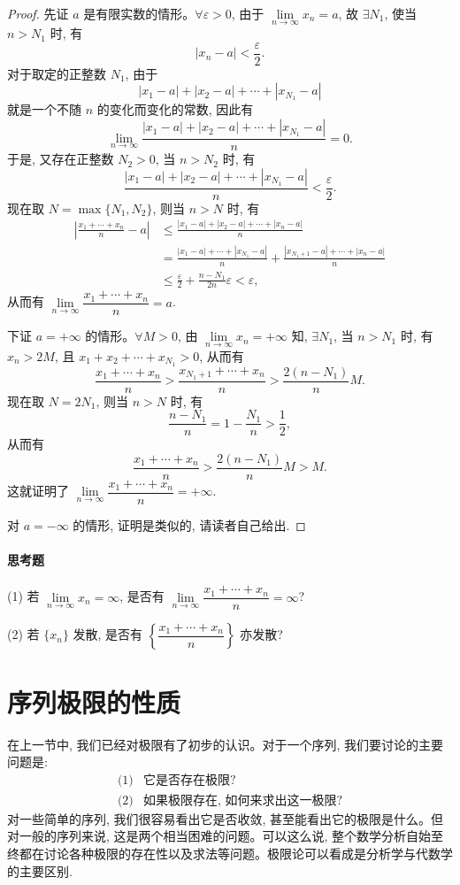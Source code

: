 \begin{proof}
先证 $a$ 是有限实数的情形。$\forall\varepsilon>0$, 由于 $\lim\limits_{n\to\infty}x_n=a$, 故 $\exists N_1$, 使当 $n>N_1$ 时, 有
\[
  |x_n-a|<\frac\varepsilon2.
\]
对于取定的正整数 $N_1$, 由于
\[
  |x_1-a|+|x_2-a|+\cdots+|x_{N_1}-a|
\]
就是一个不随 $n$ 的变化而变化的常数, 因此有
\[
  \lim_{n\to\infty}
  \frac{|x_1-a|+|x_2-a|+\cdots+|x_{N_1}-a|}{n}=0.
\]
于是, 又存在正整数 $N_2>0$, 当 $n>N_2$ 时, 有
\[
  \frac{|x_1-a|+|x_2-a|+\cdots+|x_{N_1}-a|}{n}<\frac\varepsilon2.
\]
现在取 $N=\max\{N_1,N_2\}$, 则当 $n>N$ 时, 有
\[
\begin{aligned}
  \left|\frac{x_1+\cdots+x_n}{n}-a\right|
  &\leqslant
  \frac{|x_1-a|+|x_2-a|+\cdots+|x_n-a|}{n}\\
  &=
  \frac{|x_1-a|+\cdots+|x_{N_1}-a|}{n}
  +
  \frac{|x_{N_1+1}-a|+\cdots+|x_n-a|}{n}\\
  &\leqslant \frac\varepsilon2+\frac{n-N_1}{2n}\varepsilon<\varepsilon,
\end{aligned}
\]
从而有 $\lim\limits_{n\to\infty}\dfrac{x_1+\cdots+x_n}{n}=a$.

下证 $a=+\infty$ 的情形。$\forall M>0$, 由 $\lim\limits_{n\to\infty}x_n=+\infty$ 知, $\exists N_1$, 当 $n>N_1$ 时, 有 $x_n>2M$, 且 $x_1+x_2+\cdots+x_{N_1}>0$, 从而有
\[
  \frac{x_1+\cdots+x_n}{n}
  >
  \frac{x_{N_1+1}+\cdots+x_n}{n}
  >
  \frac{2(n-N_1)}nM.
\]
现在取 $N=2N_1$, 则当 $n>N$ 时, 有
\[
  \frac{n-N_1}{n}=1-\frac{N_1}{n}>\frac12,
\]
从而有
\[
  \frac{x_1+\cdots+x_n}{n}
  >
  \frac{2(n-N_1)}nM>M.
\]
这就证明了 $\lim\limits_{n\to\infty}\dfrac{x_1+\cdots+x_n}{n}=+\infty$.

对 $a=-\infty$ 的情形, 证明是类似的, 请读者自己给出.
\end{proof}


\paragraph*{思考题}


(1) 若 $\lim\limits_{n\to\infty}x_n=\infty$, 是否有 $\lim\limits_{n\to\infty}\dfrac{x_1+\cdots+x_n}{n}=\infty$?

(2) 若 $\{x_n\}$ 发散, 是否有 $\left\{\dfrac{x_1+\cdots+x_n}{n}\right\}$ 亦发散?

\section{序列极限的性质}
\label{sec:ma-2-2}

在上一节中, 我们已经对极限有了初步的认识。对于一个序列, 我们要讨论的主要问题是:
\[
\begin{array}{ll}
  \text{(1)} & \text{它是否存在极限?}\\
  \text{(2)} & \text{如果极限存在, 如何来求出这一极限?}
\end{array}
\]
对一些简单的序列, 我们很容易看出它是否收敛, 甚至能看出它的极限是什么。但对一般的序列来说, 这是两个相当困难的问题。可以这么说, 整个数学分析自始至终都在讨论各种极限的存在性以及求法等问题。极限论可以看成是分析学与代数学的主要区别.

